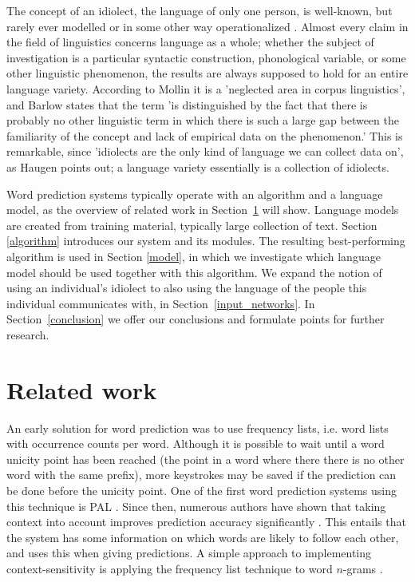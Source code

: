 \documentclass[11pt]{article}
\begin{document}
The concept of an idiolect, the language of only one person, is well-known, but rarely ever modelled or in some other way operationalized \cite{mollin09,barlow10,louwerse04}. Almost every claim in the field of linguistics concerns language as a whole; whether the subject of investigation is a particular syntactic construction, phonological variable, or some other linguistic phenomenon, the results are always supposed to hold for an entire language variety. According to Mollin  it is a 'neglected area in corpus linguistics', and Barlow  states that the term 'is distinguished by the fact that there is probably no other linguistic term in which there is such a large gap between the familiarity of the concept and lack of empirical data on the phenomenon.' This is remarkable, since 'idiolects are the only kind of language we can collect data on', as Haugen  points out; a language variety essentially is a collection of idiolects.

Word prediction systems typically operate with an algorithm and a language model, as the overview of related work in Section~\ref{related} will show. Language models are created from training material, typically large collection of text. Section \ref{algorithm} introduces our system and its modules. The resulting best-performing algorithm is used in Section \ref{model}, in which we investigate which language model should be used together with this algorithm. We expand the notion of using an individual's idiolect to also using the language of the people this individual communicates with, in Section~\ref{input_networks}. In Section~\ref{conclusion} we offer our conclusions and formulate points for further research.

\section{Related work}
\label{related}

An early solution for word prediction was to use frequency lists, i.e. word lists with occurrence counts per word. Although it is possible to wait until a word unicity point has been reached (the point in a word where there there is no other word with the same prefix), more keystrokes may be saved if the prediction can be done before the unicity point. One of the first word prediction systems using this technique is PAL \cite{swiffin+85}.  Since then, numerous authors have shown that taking context into account improves prediction accuracy significantly \cite{Lesher+99,Garay-Vitoria+06,Tanaka-Ishii07,vandenbosch+08}. This entails that the system has some information on which words are likely to follow each other, and uses this when giving predictions. A simple approach to implementing context-sensitivity is applying the frequency list technique to word $n$-grams \cite{hunnicutt87}.
\end{document}
